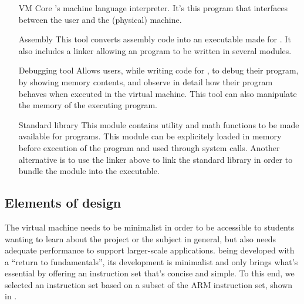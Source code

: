 \documentclass[11pt,twoside]{article}
\begin{document}
\begin{itemize}
  \item[VM Core] 's machine language interpreter. It's this program that interfaces between the user and the (physical) machine.
  \item[Assembly \noun{Eva}] This tool converts assembly code into an executable made for . It also includes a linker allowing an  program to be written in several modules.
  \item[Debugging tool] Allows users, while writing code for , to debug their program, by showing memory contents, and observe in detail how their program behaves when executed in the virtual machine. This tool can also manipulate the memory of the executing program.
  \item[Standard library] This module contains utility and math functions to be made available for  programs. This module can be explicitely loaded in memory before execution of the program and used through system calls. Another alternative is to use the linker above to link the standard library in order to bundle the module into the executable.
\end{itemize}

\subsection{Elements of design}

The virtual machine needs to be minimalist in order to be accessible to students wanting to learn about the project or the subject in general, but also needs adequate performance to support larger-scale applications.  being developed with a ``return to fundamentals'', its development is minimalist and only brings what's essential by offering an instruction set that's concise and simple. To this end, we selected an instruction set based on a subset of the ARM instruction set, shown in .
\end{document}
